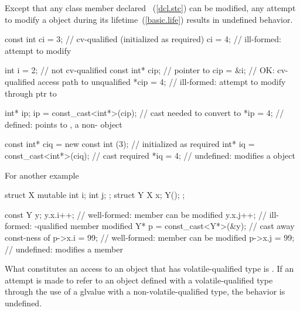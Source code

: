 \pnum
{}%
Except that any class member declared ~(\ref{dcl.stc})
can be modified, any attempt to modify a  object during its
lifetime~(\ref{basic.life}) results in undefined behavior.
\begin{example}

\begin{codeblock}
const int ci = 3;               // cv-qualified (initialized as required)
ci = 4;                         // ill-formed: attempt to modify 

int i = 2;                      // not cv-qualified
const int* cip;                 // pointer to 
cip = &i;                       // OK: cv-qualified access path to unqualified
*cip = 4;                       // ill-formed: attempt to modify through ptr to 

int* ip;
ip = const_cast<int*>(cip);     // cast needed to convert  to 
*ip = 4;                        // defined:  points to , a non- object

const int* ciq = new const int (3);     // initialized as required
int* iq = const_cast<int*>(ciq);        // cast required
*iq = 4;                                // undefined: modifies a  object
\end{codeblock}

\pnum
For another example

\begin{codeblock}
struct X {
  mutable int i;
  int j;
};
struct Y {
  X x;
  Y();
};

const Y y;
y.x.i++;                        // well-formed:  member can be modified
y.x.j++;                        // ill-formed: -qualified member modified
Y* p = const_cast<Y*>(&y);      // cast away const-ness of 
p->x.i = 99;                    // well-formed:  member can be modified
p->x.j = 99;                    // undefined: modifies a  member
\end{codeblock}
\end{example}

\pnum
What constitutes an access to an object that has volatile-qualified type is
.
If an attempt is made to refer to an object defined with a
volatile-qualified type through the use of a glvalue with a
non-volatile-qualified type, the behavior is undefined.

